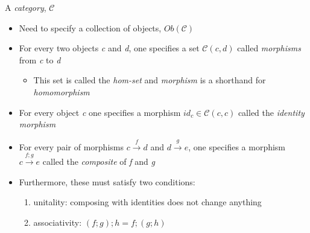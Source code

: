 
A \emph{category}, $\mathcal{C}$

\begin{itemize}
    \item Need to specify a collection of objects, $Ob(\mathcal{C})$
    \item For every two objects \emph{c} and \emph{d}, one specifies a set $\mathcal{C}(c,d)$ called \emph{morphisms} from \emph{c} to \emph{d}
          \begin{itemize}
            \item This set is called the \emph{hom-set} and \emph{morphism} is a shorthand for \emph{homomorphism}
          \end{itemize}
    \item For every object \emph{c} one specifies a morphism $id_c \in \mathcal{C}(c,c)$ called the \emph{identity morphism}
    \item For every pair of morphisms $c \xrightarrow{f} d$ and $d \xrightarrow{g} e$, one specifies a morphism $c \xrightarrow{f;g}e$ called the \emph{composite} of \emph{f} and \emph{g}
    \item Furthermore, these must satisfy two conditions:
          \begin{enumerate}
            \item unitality: composing with identities does not change anything
            \item associativity: $(f;g);h = f;(g;h)$
          \end{enumerate}
  \end{itemize}
